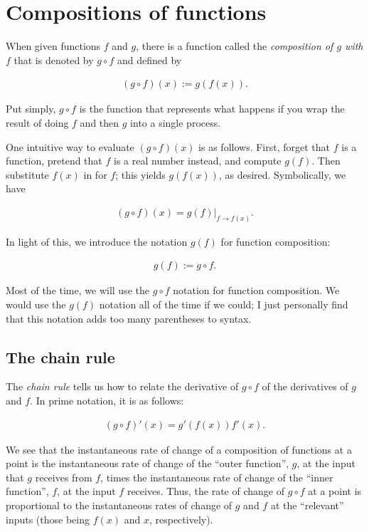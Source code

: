 \section*{Compositions of functions}

When given functions $f$ and $g$, there is a function called the \textit{composition of $g$ with $f$} that is denoted by $g \circ f$ and defined by 

\begin{align*}
    (g \circ f)(x) := g(f(x)).
\end{align*}
 
Put simply, $g \circ f$ is the function that represents what happens if you wrap the result of doing $f$ and then $g$ into a single process.

One intuitive way to evaluate $(g \circ f)(x)$ is as follows. First, forget that $f$ is a function, pretend that $f$ is a real number instead, and compute $g(f)$. Then substitute $f(x)$ in for $f$; this yields $g(f(x))$, as desired. Symbolically, we have

\begin{align*}
    (g \circ f)(x) = g(f)|_{f \rightarrow f(x)}.
\end{align*}

In light of this, we introduce the notation $g(f)$ for function composition:

\begin{align*}
    g(f) := g \circ f.
\end{align*}

Most of the time, we will use the $g \circ f$ notation for function composition. We would use the $g(f)$ notation all of the time if we could; I just personally find that this notation adds too many parentheses to syntax.

\subsection*{The chain rule}

The \textit{chain rule} tells us how to relate the derivative of $g \circ f$ of the derivatives of $g$ and $f$. In prime notation, it is as follows:

\begin{align*}
    (g \circ f)'(x) = g'(f(x)) f'(x).
\end{align*}

We see that the instantaneous rate of change of a composition of functions at a point is the instantaneous rate of change of the ``outer function'', $g$, at the input that $g$ receives from $f$, times the instantaneous rate of change of the ``inner function'', $f$, at the input $f$ receives. Thus, the rate of change of $g \circ f$ at a point is proportional to the instantaneous rates of change of $g$ and $f$ at the ``relevant'' inputs (those being $f(x)$ and $x$, respectively).

